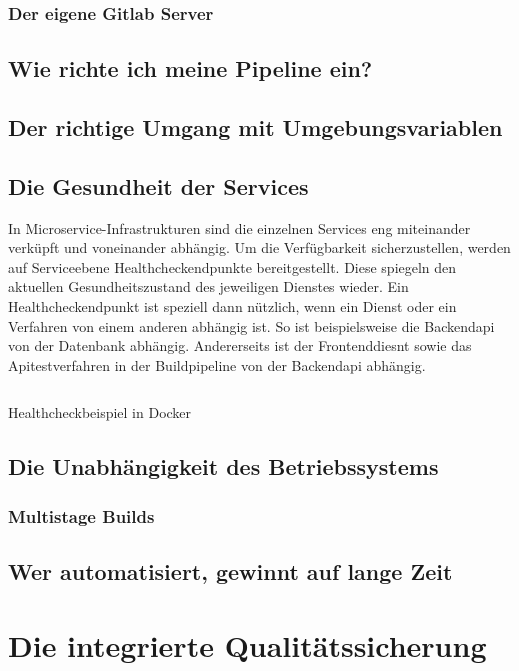 \subsection{Der eigene Gitlab Server}

\section{Wie richte ich meine Pipeline ein?}

\section{Der richtige Umgang mit Umgebungsvariablen}

\section{Die Gesundheit der Services}
In Microservice-Infrastrukturen sind die einzelnen Services eng miteinander verküpft
und voneinander abhängig. Um die Verfügbarkeit sicherzustellen, werden auf
Serviceebene Healthcheckendpunkte bereitgestellt. Diese spiegeln den aktuellen
Gesundheitszustand des jeweiligen Dienstes wieder. Ein Healthcheckendpunkt
ist speziell dann nützlich, wenn ein Dienst oder ein Verfahren von einem anderen
abhängig ist. So ist beispielsweise die Backendapi von der Datenbank
abhängig. Andererseits ist der Frontenddiesnt sowie das Apitestverfahren
in der Buildpipeline von der Backendapi abhängig. 

\begin{listing}
    \label{lst:healthcheck}
    \inputminted{sh}{snippets/sh/healthcheck.sh}
    \caption{Healthcheckbeispiel in Docker}
\end{listing}

\section{Die Unabhängigkeit des Betriebssystems}
\subsection{Multistage Builds}

\section{Wer automatisiert, gewinnt auf lange Zeit}

\chapter{Die integrierte Qualitätssicherung}

